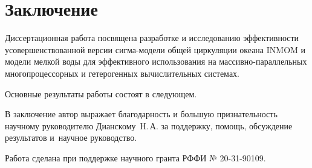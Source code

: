 \chapter*{Заключение}                       %


Диссертационная работа посвящена разработке и исследованию эффективности усовершенствованной версии сигма-модели общей циркуляции океана INMOM и модели мелкой воды для эффективного использования на массивно-параллельных многопроцессорных и гетерогенных вычислительных системах.

Основные результаты работы состоят в следующем.


В заключение автор выражает благодарность и большую признательность научному руководителю Дианскому~Н.\,А. за поддержку, помощь, обсуждение результатов и~научное руководство.

Работа сделана при поддержке научного гранта РФФИ № 20-31-90109.
